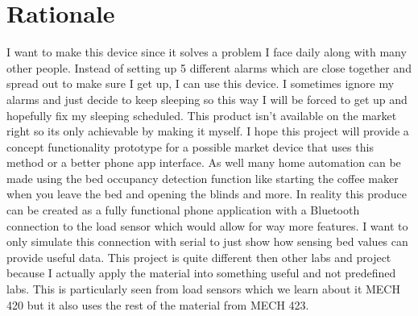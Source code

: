 \documentclass[11pt]{article}
\begin{document}
\section{Rationale}
I want to make this device since it solves a problem I face daily along with many other people.
Instead of setting up 5 different alarms which are close together and spread out to make sure I get up, I can use this device.
I sometimes ignore my alarms and just decide to keep sleeping so this way I will be forced to get up and hopefully fix my sleeping scheduled.
This product isn't available on the market right so its only achievable by making it myself.
I hope this project will provide a concept functionality prototype for a possible market device that uses this method or a better phone app interface. 
As well many home automation can be made using the bed occupancy detection function like starting the coffee maker when you leave the bed and opening the blinds and more.
In reality this produce can be created as a fully functional phone application with a Bluetooth connection to the load sensor which would allow for way more features.
I want to only simulate this connection with serial to just show how sensing bed values can provide useful data.
This project is quite different then other labs and project because I actually apply the material into something useful and not predefined labs.
This is particularly seen from load sensors which we learn about it MECH 420 but it also uses the rest of the material from MECH 423. 
\end{document}
